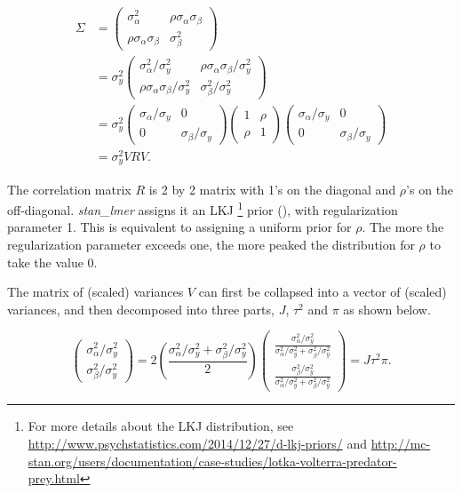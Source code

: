 $$
\begin{aligned}
\Sigma &= 
\left(\begin{matrix} 
\sigma_\alpha^2 & \rho\sigma_\alpha \sigma_\beta \\ 
\rho\sigma_\alpha\sigma_\beta&\sigma_\beta^2 
\end{matrix} \right)\\ &= 
\sigma_y^2\left(\begin{matrix} 
\sigma_\alpha^2/\sigma_y^2 & \rho\sigma_\alpha \sigma_\beta/\sigma_y^2 \\ 
\rho\sigma_\alpha\sigma_\beta/\sigma_y^2 & \sigma_\beta^2/\sigma_y^2 
\end{matrix} \right)\\ &= 
\sigma_y^2\left(\begin{matrix} 
\sigma_\alpha/\sigma_y & 0 \\ 
0&\sigma_\beta/\sigma_y
\end{matrix} \right)
\left(\begin{matrix} 
1 & \rho\\ 
\rho&1 
\end{matrix} \right)
\left(\begin{matrix} 
\sigma_\alpha/\sigma_y & 0 \\ 
0&\sigma_\beta/\sigma_y 
\end{matrix} \right)\\ 
&= \sigma_y^2VRV.
\end{aligned}
$$

The correlation matrix $R$ is 2 by 2 matrix with 1's on the diagonal and $\rho$'s on the off-diagonal. \textit{stan\_lmer} assigns it an LKJ \footnote{For more details about the LKJ distribution, see \url{http://www.psychstatistics.com/2014/12/27/d-lkj-priors/} and \url{http://mc-stan.org/users/documentation/case-studies/lotka-volterra-predator-prey.html}} prior (\cite{lewandowski2009generating}), with regularization parameter 1.  This is equivalent to assigning a uniform prior for $\rho$.  The more the regularization parameter exceeds one, the more peaked the distribution for $\rho$ to take the value 0.  

The matrix of (scaled) variances $V$ can first be collapsed into a vector of (scaled) variances, and then decomposed into three parts, $J$, $\tau^2$ and $\pi$ as shown below. 

$$
\left(\begin{matrix} 
\sigma_\alpha^2/\sigma_y^2 \\ 
\sigma_\beta^2/\sigma_y^2 
\end{matrix} \right) = 
2\left(\frac{\sigma_\alpha^2/\sigma_y^2 + \sigma_\beta^2/\sigma_y^2}{2}\right)\left(\begin{matrix} 
\frac{\sigma_\alpha^2/\sigma_y^2}{\sigma_\alpha^2/\sigma_y^2 + \sigma_\beta^2/\sigma_y^2} \\ 
\frac{\sigma_\beta^2/\sigma_y^2}{\sigma_\alpha^2/\sigma_y^2 + \sigma_\beta^2/\sigma_y^2} 
\end{matrix} \right)=
J\tau^2 \pi. 
$$  

